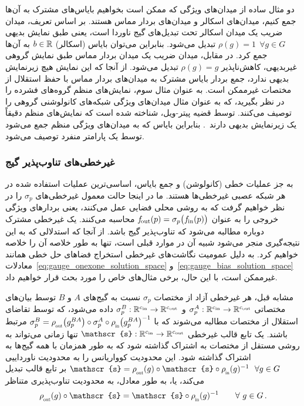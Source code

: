 دو مثال ساده از میدان‌های ویژگی که ممکن است بخواهیم بایاس‌های مشترک به آن‌ها جمع کنیم، میدان‌های اسکالر و میدان‌های بردار مماس هستند.
بر اساس تعریف، میدان ضریب یک میدان اسکالر تحت تبدیل‌های گیج ناوردا است، یعنی طبق نمایش بدیهی ${\rho(g)=1\ \ \forall g\in G}$ تبدیل می‌شود.
بنابراین می‌توان بایاس (اسکالر) $b \in \mathbb{R}$ به آن‌ها جمع کرد.
در مقابل، میدان ضریب یک میدان بردار مماس طبق نمایش گروهی غیربدیهی، کاهش‌ناپذیر $\rho(g)=g$ تبدیل می‌شود.
از آنجا که این نمایش هیچ زیرنمایش بدیهی ندارد، جمع بردار بایاس مشترک به میدان‌های بردار مماس با حفظ استقلال از مختصات غیرممکن است.
به عنوان مثال سوم، نمایش‌های منظم گروه‌های فشرده را در نظر بگیرید، که به عنوان مثال میدان‌های ویژگی شبکه‌های کانولوشنی گروهی را توصیف می‌کنند.
توسط قضیه پیتر-ویل، شناخته شده است که نمایش‌های منظم دقیقاً یک زیرنمایش بدیهی دارند~\cite{gurarie1992symmetries,gallier2019harmonicRepr}.
بنابراین بایاس که به میدان‌های ویژگی منظم جمع می‌شود توسط یک پارامتر منفرد توصیف می‌شود.
















\subsubsection{غیرخطی‌های تناوب‌پذیر گیج}
\label{sec:gauge_nonlinearities}


به جز عملیات خطی (کانولوشن) و جمع بایاس، اساسی‌ترین عملیات استفاده شده در هر شبکه عصبی غیرخطی‌ها هستند.
ما در اینجا حالت معمول غیرخطی‌های $\sigma_p$ را در نظر خواهیم گرفت که به روشی محلی فضایی عمل می‌کنند، یعنی بردارهای ویژگی خروجی را به عنوان $f_\textup{\:\!\!out}(p) = \sigma_p\big( f_\textup{\;\!\!in}(p) \big)$ محاسبه می‌کنند.
یک غیرخطی مشترک دوباره مطالبه می‌شود که تناوب‌پذیر گیج باشد.
از آنجا که استدلالی که به این نتیجه‌گیری منجر می‌شود شبیه آن در موارد قبلی است، تنها به طور خلاصه آن را خلاصه خواهیم کرد.
به دلیل عمومیت نگاشت‌های غیرخطی استخراج فضاهای حل خطی همانند معادلات~\eqref{eq:gauge_onexone_solution_space} و~\eqref{eq:gauge_bias_solution_space} غیرممکن است، با این حال، برخی مثال‌های خاص را مورد بحث قرار خواهیم داد.


مشابه قبل، هر غیرخطی آزاد از مختصات $\sigma_p$ نسبت به گیج‌های $A$ و $B$ توسط بیان‌های مختصاتی $\sigma_p^A: \mathbb{R}^{{c_\textup{in}}} \to \mathbb{R}^{{c_\textup{out}}}$ و $\sigma_p^B: \mathbb{R}^{{c_\textup{in}}} \to \mathbb{R}^{{c_\textup{out}}}$ داده می‌شود، که توسط تقاضای استقلال از مختصات مطالبه می‌شوند که با $\sigma_p^B = \rhoout\big( g_p^{BA}\big) \circ \sigma_p^A \circ \rhoin\big( g_p^{BA}\big)^{-1}$ مرتبط باشند.
یک تابع قالب غیرخطی $\mathscr{s}: \R^{\cin} \to \R^{\cout}$ تنها زمانی می‌تواند به روشی مستقل از مختصات به اشتراک گذاشته شود که به طور همزمان با همه گیج‌ها به اشتراک گذاشته شود.
این محدودیت کوواریانس را به محدودیت ناورداییی $\mathscr{s} = \rhoout(g) \circ \mathscr{s} \circ \rhoin(g)^{-1}\ \ \forall g\in G$ بر تابع قالب تبدیل می‌کند، یا، به طور معادل، به محدودیت تناوب‌پذیری متناظر
\begin{align}\label{eq:gauge_constraint_nonlinearities}
	\rhoout(g) \circ \mathscr{s} = \mathscr{s} \circ \rhoin(g)^{-1} \qquad \forall\ g\in G \,.
\end{align}



